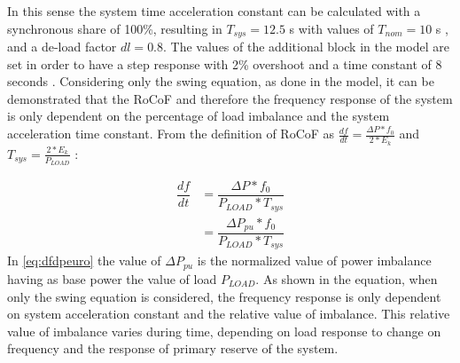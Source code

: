 In this sense the system time acceleration constant can be calculated with a synchronous share of 100\%, resulting in $ T_{sys}=12.5 $ s  with values of $ T_{nom}=10 $ s \cite{ENTSOE.2016}\cite{Anderson.2002}, and a de-load factor $ dl=0.8 $.
The values of the additional block in the model are set in order to have a step response with 2\% overshoot and a time constant of 8 seconds \cite{ogata1999ingenieria}.
Considering only the swing equation, as done in the model, it can be demonstrated that the RoCoF and therefore the frequency response of the system is only dependent on the percentage of load imbalance and the system acceleration time constant.
From the definition of RoCoF as $ \frac{df}{dt}=\frac{\Delta P*f_0}{2*E_k} $ and  $ T_{sys}=\frac{2*E_k}{P_{LOAD}} $ :

\begin{align}
	\dfrac{df}{dt} &=\dfrac{\Delta P*f_0}{P_{LOAD}*T_{sys}} \nonumber\\
	&=\dfrac{\Delta P_{pu}*f_0}{P_{LOAD}*T_{sys}}
	\label{eq:dfdpeuro}
\end{align}
In \eqref{eq:dfdpeuro} the value of $ \Delta P_{pu} $ is the normalized value of power imbalance having as base power the value of load $ P_{LOAD} $. As shown in the equation, when only the swing equation is considered, the frequency response is only dependent on system acceleration constant and the relative value of imbalance. This relative value of imbalance varies during time, depending on load response to change on frequency and the response of primary reserve of the system.


